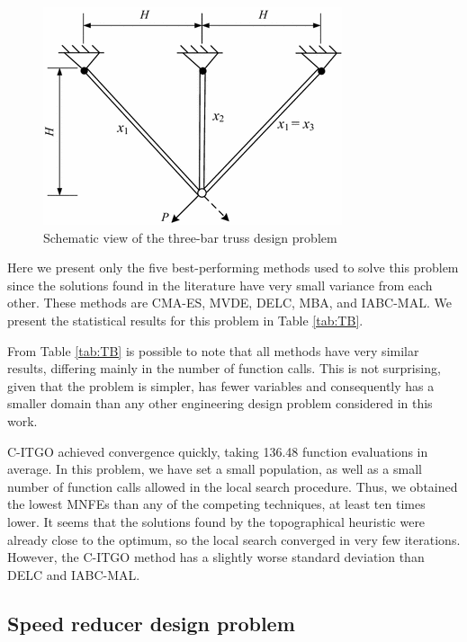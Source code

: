 \begin{figure}[h]
\begin{center}
\includegraphics[scale=0.5]{Imgs/TB.png}
\end{center}
\captionsetup{justification=centering}
\caption{Schematic view of the three-bar truss design problem}\label{fig:TB}
\end{figure}


Here we present only the five best-performing methods used to solve this problem since the solutions found in the literature have very small variance from each other. These methods are CMA-ES, MVDE, DELC, MBA, and IABC-MAL. We present the statistical results for this problem in Table \ref{tab:TB}.



From Table \ref{tab:TB} is possible to note that all methods have very similar results, differing mainly in the number of function calls. This is not surprising, given that the problem is simpler, has fewer variables and consequently has a smaller domain than any other engineering design problem considered in this work.

C-ITGO achieved convergence quickly, taking 136.48 function evaluations in average. In this problem, we have set a small population, as well as a small number of function calls allowed in the local search procedure. Thus, we obtained the lowest MNFEs than any of the competing techniques, at least ten times lower. It seems that the solutions found by the topographical heuristic were already close to the optimum, so the local search converged in very few iterations. However, the C-ITGO method has a slightly worse standard deviation than DELC and IABC-MAL.



\subsection{Speed reducer design problem}

